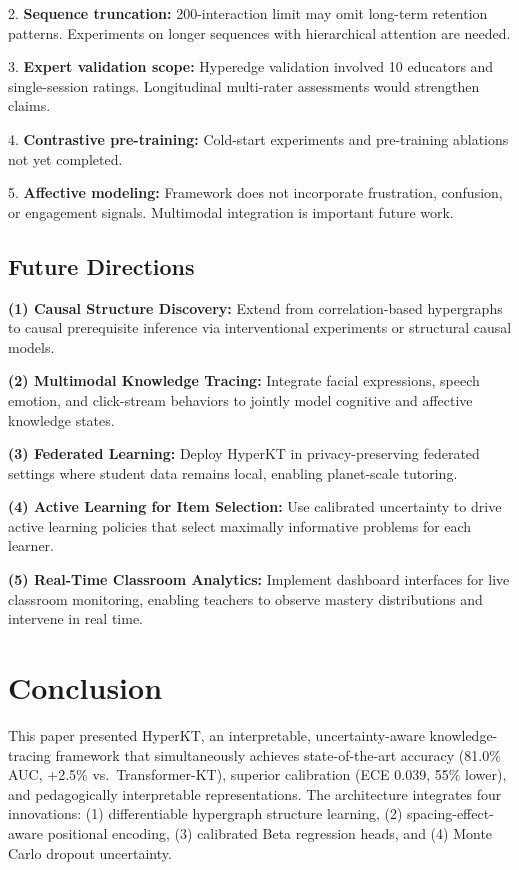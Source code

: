 \documentclass[preprint,12pt]{elsarticle}
\begin{document}
2. \textbf{Sequence truncation:} 200-interaction limit may omit long-term retention patterns. Experiments on longer sequences with hierarchical attention are needed.

3. \textbf{Expert validation scope:} Hyperedge validation involved 10 educators and single-session ratings. Longitudinal multi-rater assessments would strengthen claims.

4. \textbf{Contrastive pre-training:} Cold-start experiments and pre-training ablations not yet completed.

5. \textbf{Affective modeling:} Framework does not incorporate frustration, confusion, or engagement signals. Multimodal integration is important future work.

\subsection{Future Directions}

\textbf{(1) Causal Structure Discovery:} Extend from correlation-based hypergraphs to causal prerequisite inference via interventional experiments or structural causal models.

\textbf{(2) Multimodal Knowledge Tracing:} Integrate facial expressions, speech emotion, and click-stream behaviors to jointly model cognitive and affective knowledge states.

\textbf{(3) Federated Learning:} Deploy HyperKT in privacy-preserving federated settings where student data remains local, enabling planet-scale tutoring.

\textbf{(4) Active Learning for Item Selection:} Use calibrated uncertainty to drive active learning policies that select maximally informative problems for each learner.

\textbf{(5) Real-Time Classroom Analytics:} Implement dashboard interfaces for live classroom monitoring, enabling teachers to observe mastery distributions and intervene in real time.

\section{Conclusion}\label{sec:conclusion}

This paper presented HyperKT, an interpretable, uncertainty-aware knowledge-tracing framework that simultaneously achieves state-of-the-art accuracy (81.0\% AUC, +2.5\% vs.\ Transformer-KT), superior calibration (ECE 0.039, 55\% lower), and pedagogically interpretable representations. The architecture integrates four innovations: (1) differentiable hypergraph structure learning, (2) spacing-effect-aware positional encoding, (3) calibrated Beta regression heads, and (4) Monte Carlo dropout uncertainty.
\end{document}
